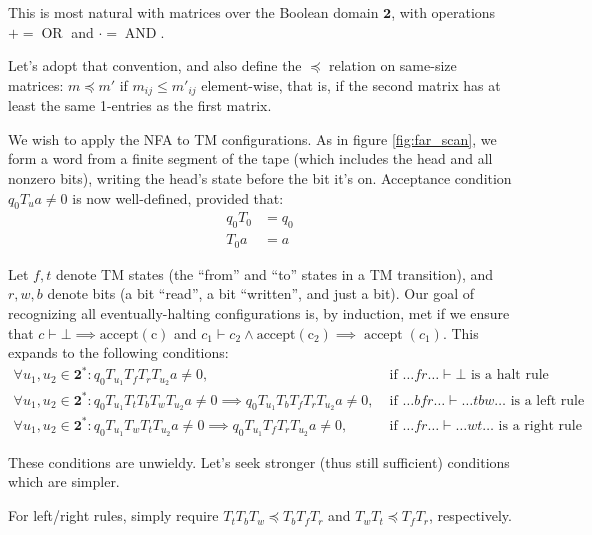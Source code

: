 This is most natural with matrices over the Boolean domain $\mathbf{2}$, with operations $+=\operatorname{OR}$ and $\cdot=\operatorname{AND}$.

Let's adopt that convention, and also define the $\preceq$ relation on same-size matrices: $m\preceq m'$ if $m_{ij}\le m'_{ij}$ element-wise,
that is, if the second matrix has at least the same 1-entries as the first matrix.

We wish to apply the NFA to TM configurations.
As in figure \ref{fig:far_scan}, we form a word from a finite segment of the tape (which includes the head and all nonzero bits), writing the head's state before the bit it's on.
Acceptance condition $q_0 T_u a\ne 0$ is now well-defined, provided that:
\begin{align}
  q_0 T_0 &= q_0
  \label{far-cond-leading-0}
  \\
  T_0 a &= a
  \label{far-cond-trailing-0}
\end{align}

Let $f,t$ denote TM states (the ``from'' and ``to'' states in a TM transition), and $r,w,b$ denote bits (a bit ``read'', a bit ``written'', and just a bit).
Our goal of recognizing all eventually-halting configurations is, by induction, met if we ensure that $c\vdash\bot\implies\operatorname{accept(c)}$
and $c_1\vdash c_2\land\operatorname{accept(c_2)}\implies\operatorname{accept}(c_1)$.
This expands to the following conditions:
\begin{align*}
  \forall u_1,u_2\in\mathbf{2}^*: q_0 T_{u_1} T_f T_r T_{u_2} a \ne 0,\;& \text{if $\ldots fr\ldots\vdash\bot$ is a halt rule}
  \\
  \forall u_1,u_2\in\mathbf{2}^*: q_0 T_{u_1} T_t T_b T_w T_{u_2} a \ne 0 \implies q_0 T_{u_1} T_b T_f T_r T_{u_2} a \ne 0,\;& \text{if $\ldots bfr\ldots\vdash\ldots tbw\ldots$ is a left rule}
  \\
  \forall u_1,u_2\in\mathbf{2}^*: q_0 T_{u_1} T_w T_t T_{u_2} a \ne 0 \implies q_0 T_{u_1} T_f T_r T_{u_2} a \ne 0,\;& \text{if $\ldots fr\ldots\vdash\ldots wt\ldots$ is a right rule}
\end{align*}

These conditions are unwieldy. Let's seek stronger (thus still sufficient) conditions which are simpler.

For left/right rules, simply require $T_t T_b T_w\preceq T_b T_f T_r$ and $T_w T_t\preceq T_f T_r$, respectively.

